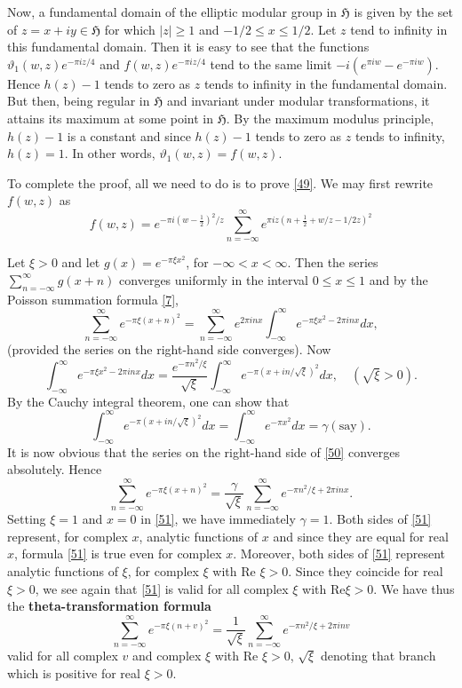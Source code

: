Now, a fundamental domain of the elliptic modular group in
$\mathfrak{H}$ is given by the set of $z=x+iy\in\mathfrak{H}$ for
which $|z|\geq 1$ and $-1/2\leq x\leq 1/2$. Let $z$ tend to infinity
in this fundamental domain. Then it is easy to see that the functions
$\vartheta_{1}(w,z)e^{-\pi iz/4}$ and $f(w,z)e^{-\pi iz/4}$ tend to
the same limit $-i(e^{\pi iw}-e^{-\pi iw})$. Hence $h(z)-1$ tends to
zero as $z$ tends to infinity in the fundamental domain. But then,
being regular in $\mathfrak{H}$ and invariant under modular
transformations, it attains its maximum at some point in
$\mathfrak{H}$. By the maximum modulus principle, $h(z)-1$ is a
constant and since $h(z)-1$ tends to zero as $z$ tends to infinity,
$h(z)=1$. In other words, $\vartheta_{1}(w,z)=f(w,z)$.

To complete the proof, all we need to do is to prove \eqref{49}. We
may first rewrite $f(w,z)$ as 
$$
f(w,z)=e^{-\pi i(w-\frac{1}{2})^{2}/z}\sum^{\infty}_{n=-\infty}e^{\pi
  iz(n+\frac{1}{2}+w/z-1/2z)^{2}}
$$\pageoriginale 

Let $\xi>0$ and let $g(x)=e^{-\pi \xi x^{2}}$, for
$-\infty<x<\infty$. Then the series
$\sum\limits^{\infty}_{n=-\infty}g(x+n)$ converges uniformly in the
interval $0\leq x\leq 1$ and by the Poisson summation formula
\eqref{7},
\begin{equation*}
\sum^{\infty}_{n=-\infty}e^{-\pi
  \xi(x+n)^{2}}=\sum^{\infty}_{n=-\infty}e^{2\pi
  inx}\int^{\infty}_{-\infty}e^{-\pi \xi x^{2}-2\pi inx}dx,\tag{50}\label{50}
\end{equation*}
(provided the series on the right-hand side converges). Now
$$
\int^{\infty}_{-\infty}e^{-\pi \xi x^{2}-2\pi inx}dx=\frac{e^{-\pi
    n^{2}/\xi}}{\sqrt{\xi}}\int^{\infty}_{-\infty}e^{-\pi(x+in/\sqrt{\xi})^{2}}dx,\quad
(\sqrt{\xi}>0). 
$$
By the Cauchy integral theorem, one can show that
$$
\int^{\infty}_{-\infty}e^{-\pi(x+in/\sqrt{\xi})^{2}}dx=\int^{\infty}_{-\infty}e^{-\pi
  x^{2}}dx=\gamma(\text{say}). 
$$
It is now obvious that the series on the right-hand side of \eqref{50}
converges absolutely. Hence
\begin{equation*}
\sum^{\infty}_{n=-\infty}e^{-\pi
  \xi(x+n)^{2}}=\frac{\gamma}{\sqrt{\xi}}\sum^{\infty}_{n=-\infty}e^{-\pi
  n^{2}/\xi+2\pi inx}.\tag{51}\label{51}
\end{equation*}
Setting $\xi=1$ and $x=0$ in \eqref{51}, we have immediately
$\gamma=1$. Both sides of \eqref{51} represent, for complex $x$,
analytic functions of $x$ and since they are equal for real $x$,
formula \eqref{51} is true even for complex $x$. Moreover, both sides
of \eqref{51} represent analytic functions of $\xi$, for complex $\xi$
with $\text{Re }\xi>0$. Since they coincide for real $\xi>0$, we see
again that \eqref{51} is valid for all complex $\xi$ with $\text{Re
}\xi>0$. We have thus the {\bf theta-transformation formula}
\begin{equation*}
\sum^{\infty}_{n=-\infty}e^{-\pi\xi(n+v)^{2}}=\frac{1}{\sqrt{\xi}}\sum^{\infty}_{n=-\infty}e^{-\pi
  n^{2}/\xi+2\pi inv}\tag{52}\label{52}
\end{equation*}
valid for all complex $v$ and complex $\xi$ with $\text{Re }\xi>0$,
$\sqrt{\xi}$ denoting that branch which is positive for real $\xi>0$.

